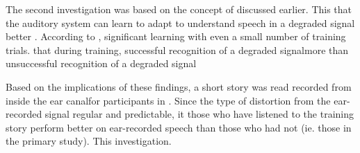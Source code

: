 The second investigation was based on the concept of \DIFdelbegin {}\DIFdelend \DIFaddbegin {}\DIFaddend discussed earlier.  This \DIFdelbegin {}\DIFdelend \DIFaddbegin {}\DIFaddend that the auditory system can learn to adapt to understand speech in a degraded signal better \DIFdelbegin {}\DIFdelend \DIFaddbegin {}\DIFaddend .  According to \cite{mattys:12}, significant learning \DIFdelbegin {}\DIFdelend \DIFaddbegin {}\DIFaddend with even a small number of training trials.  \cite{davis:05} \DIFdelbegin {}\DIFdelend \DIFaddbegin {}\DIFaddend that during training, successful recognition of a degraded signal\DIFdelbegin {}\DIFdelend \DIFaddbegin \DIFadd{, }\DIFaddend more than unsuccessful recognition of a degraded signal\DIFdelbegin {}%

\DIFdelend \DIFaddbegin {}\DIFaddend Based on the implications of these findings, a short story was read \DIFdelbegin {}\DIFdelend \DIFaddbegin {}\DIFaddend recorded from inside the ear canal\DIFdelbegin {}\DIFdelend \DIFaddbegin {}\DIFaddend for participants in \DIFdelbegin {}\DIFdelend \DIFaddbegin {}\DIFaddend .  Since the type of distortion from the ear-recorded signal \DIFdelbegin {}\DIFdelend \DIFaddbegin {}\DIFaddend regular and predictable, it \DIFdelbegin {}\DIFdelend \DIFaddbegin {}\DIFaddend those who have listened to the training story \DIFdelbegin {}\DIFdelend \DIFaddbegin {}\DIFaddend perform better on ear-recorded speech than those who had not \DIFaddbegin {}\DIFaddend (ie. those in the primary study). This \DIFdelbegin {}\DIFdelend \DIFaddbegin {}\DIFaddend investigation.

